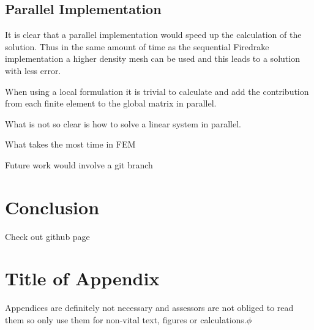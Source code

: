 \documentclass[12pt]{ociamthesis}
\begin{document}
\subsection{Parallel Implementation}
It is clear that a parallel implementation would speed up the calculation of the solution. Thus in the same amount of time as the sequential Firedrake implementation a higher density mesh can be used and this leads to a solution with less error.

When using a local formulation it is trivial to calculate and add the contribution from each finite element to the global matrix in parallel.

What is not so clear is how to solve a linear system in parallel. 

What takes the most time in FEM

Future work would involve a git branch 

\section{Conclusion}
Check out github page \cite{Hub}

\printbibliography[heading=bibintoc]

\appendix

\section{Title of Appendix}

Appendices are definitely not necessary and assessors are not obliged to read them so only use them for non-vital text, figures or calculations.$\phi$
\end{document}
